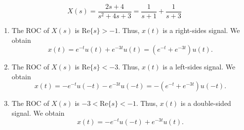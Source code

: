\begin{frame}[t]{}
    {
        \begin{solution}
            \begin{equation*}
                X(s) = \frac{2s+4}{s^2 + 4s+ 3} = \frac{1}{s+1} + \frac{1}{s+3}
            \end{equation*}
        \end{solution}

        \begin{enumerate}
            \item<2-> The ROC of $X(s)$ is $\mathrm{Re}\{s\} > -1$. Thus, $x(t)$ is a right-sides signal. We obtain
            \begin{equation*}
                x(t) = e^{-t}u(t) + e^{-3t}u(t) = (e^{-t}+ e^{-3t})u(t).
            \end{equation*}

            \item<3-> The ROC of $X(s)$ is $\mathrm{Re}\{s\} < -3$. Thus, $x(t)$ is a left-sides signal. We obtain
            \begin{equation*}
                x(t) = -e^{-t}u(-t) - e^{-3t}u(-t) = -(e^{-t}+ e^{-3t})u(-t).
            \end{equation*}

            \item<4-> The ROC of $X(s)$ is $-3 < \mathrm{Re}\{s\} < -1$. Thus, $x(t)$ is a double-sided signal. We obtain
            \begin{equation*}
                x(t) = -e^{-t}u(-t) + e^{-3t}u(t).
            \end{equation*}
        \end{enumerate}
    }
\end{frame}

